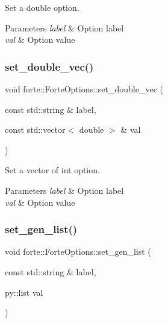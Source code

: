 Set a double option. 


\begin{DoxyParams}{Parameters}
{\em label} & Option label \\
\hline
{\em val} & Option value \\
\hline
\end{DoxyParams}
\mbox{\label{classforte_1_1_forte_options_a201555973acf31010e6a897f83baa7cd}} 
\subsubsection{\texorpdfstring{set\+\_\+double\+\_\+vec()}{set\_double\_vec()}}
{\footnotesize\ttfamily void forte\+::\+Forte\+Options\+::set\+\_\+double\+\_\+vec (\begin{DoxyParamCaption}\item[{const std\+::string \&}]{label,  }\item[{const std\+::vector$<$ double $>$ \&}]{val }\end{DoxyParamCaption})}



Set a vector of int option. 


\begin{DoxyParams}{Parameters}
{\em label} & Option label \\
\hline
{\em val} & Option value \\
\hline
\end{DoxyParams}
\mbox{\label{classforte_1_1_forte_options_a20ac5982e5360de3ff5d527358ed0892}} 
\subsubsection{\texorpdfstring{set\+\_\+gen\+\_\+list()}{set\_gen\_list()}}
{\footnotesize\ttfamily void forte\+::\+Forte\+Options\+::set\+\_\+gen\+\_\+list (\begin{DoxyParamCaption}\item[{const std\+::string \&}]{label,  }\item[{py\+::list}]{val }\end{DoxyParamCaption})}



